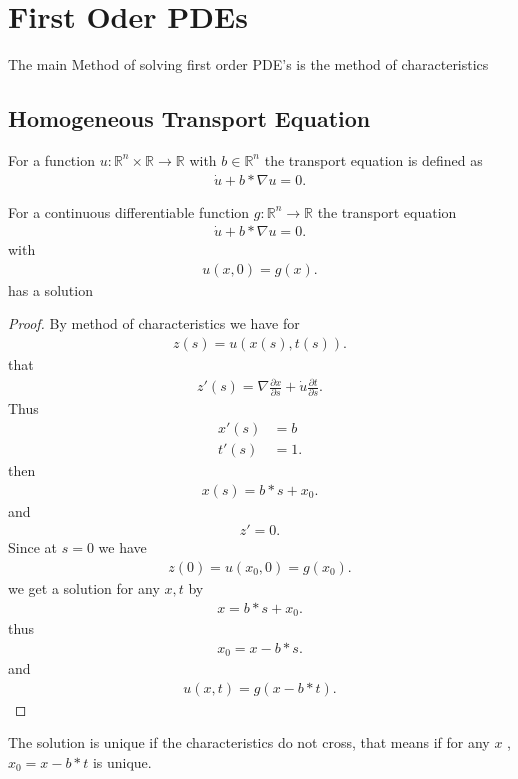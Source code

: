 \chapter{First Oder PDEs}
The main Method of solving first order PDE's is the method of characteristics
\section{Homogeneous Transport Equation}
\begin{definition}
 For a function $u : \mathbb{R}^{n} \times  \mathbb{R} \to \mathbb{R} $  with 
 $b \in  \mathbb{R}^{n} $ the transport equation is defined as 
 \begin{align*}
  \dot{u}  + b*\nabla u = 0
 .\end{align*}
\end{definition}
\begin{Theorem}[1.2.]
 For a continuous differentiable function $g : \mathbb{R}^{n} \to \mathbb{R} $  the transport equation 
 \begin{align*}
  \dot{u}  + b*\nabla u = 0
 .\end{align*}
 with 
 \begin{align*}
  u(x,0) = g(x)
 .\end{align*}
 has a solution
\end{Theorem}
\begin{proof}
 By method of characteristics we have for 
 \begin{align*}
  z(s) = u(x(s),t(s))
 .\end{align*}
 that 
 \begin{align*}
  z'(s) = \nabla \frac{\partial x}{\partial s} + \dot{u} \frac{\partial t}{\partial s}
 .\end{align*}
 Thus 
 \begin{align*}
   x'(s) &= b\\
   t'(s) &= 1
 .\end{align*}
 then 
 \begin{align*}
  x(s) = b*s + x_{0}
 .\end{align*}
and 
\begin{align*}
  z' = 0
.\end{align*}
Since at $s=0$ we have 
\begin{align*}
  z(0) = u(x_{0},0) = g(x_{0})
.\end{align*}
we get a solution for any $x,t$ by 
\begin{align*}
  x = b*s+x_{0}
.\end{align*}
thus 
\begin{align*}
  x_{0} = x-b*s
.\end{align*}
and 
\begin{align*}
  u(x,t) = g(x-b*t)
.\end{align*}
\end{proof}
\begin{corollary}
  The solution is unique if the characteristics do not cross,
  that means if for any $x$ , $x_{0} = x-b*t$ is unique.
\end{corollary}
